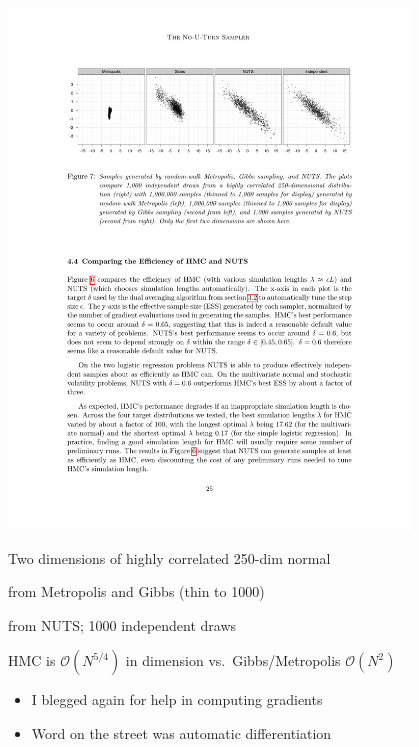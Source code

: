 \documentclass[9pt]{report}
\begin{document}
\vspace*{-6pt}
\begin{center}
  \includegraphics[width=0.8\textwidth]{img/nuts-vs.pdf}
\end{center}
\vspace*{-10pt}
\begin{subitemize}
\item \small Two dimensions of highly correlated 250-dim normal
\item \small {} from Metropolis and Gibbs (thin to 1000)
\item \small {} from NUTS; 1000 independent draws
  \item HMC is $\mathcal{O}(N^{5/4})$ in dimension
    vs.\ Gibbs/Metropolis $\mathcal{O}(N^2)$
\end{subitemize}


\begin{itemize}
\item I blegged again for help in computing gradients
\item Word on the street was automatic differentiation
\end{itemize}
\end{document}
